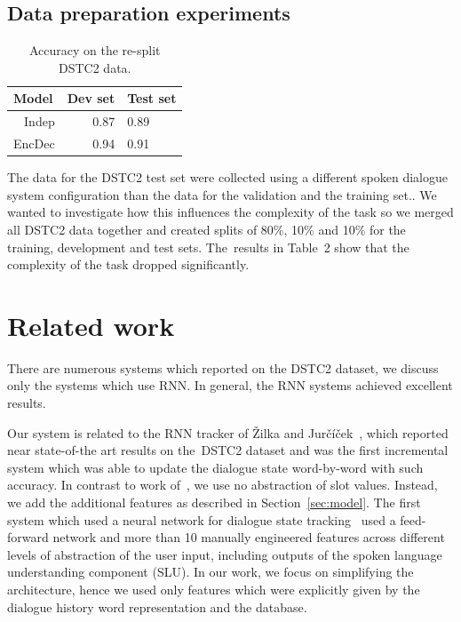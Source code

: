 \documentclass{itatnew}
\begin{document}
\subsection{Data preparation experiments}
\label{sec:split}

\begin{table}
\begin{center}
\begin{tabular}{r@{\quad}rll}
\hline
\multicolumn{1}{l}{\rule{0pt}{12pt}
                   Model}&\multicolumn{1}{l}{Dev set}&\multicolumn{2}{l}{Test set}\\[2pt]
\hline\rule{0pt}{12pt}
Indep  &   0.87 & 0.89 \\
EncDec &   0.94 & 0.91 \\
\hline
\end{tabular}
\caption{Accuracy on the re-split DSTC2 data.}
\vspace{-2em}
\end{center}
\label{tabsplit}
\end{table}

The data for the DSTC2 test set were collected using a different spoken dialogue system configuration than the data for the validation and the training set.\cite{henderson2014second}.
We wanted to investigate how this influences the complexity of the task so we merged all DSTC2 data together and created splits of 80\%, 10\% and 10\% for the training, development and test sets.
The~results in Table~2 show that the complexity of the task dropped significantly.


\section{Related work}
\label{sec:related}

There are numerous systems which reported on the DSTC2 dataset, we discuss only the systems which use RNN. In general, the RNN systems achieved excellent results.

Our system is related to the RNN tracker of Žilka and Jurčíček~\cite{zilka2015incremental},
which reported near state-of-the art results on the~DSTC2 dataset and was the first incremental system which was able to update the dialogue state word-by-word with such accuracy.
In contrast to work of~\cite{zilka2015incremental}, we use no abstraction of slot values. Instead, we add the additional features as described in Section~\ref{sec:model}.
The first system which used a neural network for dialogue state tracking~\cite{henderson2013deep} used a feed-forward network and more than 10 manually engineered features across different levels of abstraction of the user input, including outputs of the spoken language understanding component (SLU).
In our work, we focus on simplifying the architecture, hence we used only features which were explicitly given by the dialogue history word representation and the database.
\end{document}
